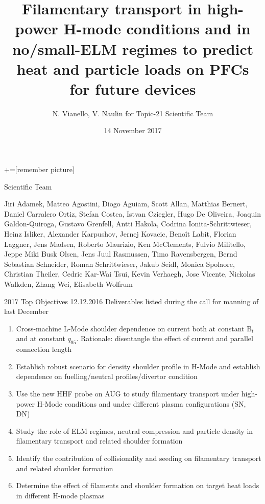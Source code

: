 \documentclass[10pt, compress]{beamer}
\title{{\small Filamentary transport in high-power H-mode conditions and in
  no/small-ELM regimes to predict heat and particle loads on PFCs for
  future devices}}
\date{{\footnotesize 14 November 2017}}
\author[N. Vianello and V. Naulin]{N. Vianello, V. Naulin for Topic-21
Scientific Team}
\newcommand\Fontvi{\fontsize{8}{7.2}\selectfont}
\begin{document}
+=[remember picture]
\maketitle
\begin{frame}{Scientific Team}
\begin{center}
  Jiri Adamek, Matteo Agostini, Diogo Aguiam, Scott Allan, Matthias Bernert, Daniel Carralero Ortiz, 
Stefan Costea, Istvan Cziegler, Hugo De Oliveira, Joaquin Galdon-Quiroga, Gustavo Grenfell, Antti Hakola, 
Codrina Ionita-Schrittwieser, Heinz Isliker, Alexander Karpushov, Jernej Kovacic, Benoît Labit, Florian Laggner, Jens Madsen, 
Roberto Maurizio, Ken McClements, Fulvio Militello, Jeppe Miki Busk Olsen, Jens Juul Rasmussen, Timo Ravensbergen, Bernd Sebastian Schneider, Roman Schrittwieser, Jakub Seidl, Monica Spolaore, Christian Theiler, Cedric Kar-Wai Tsui, Kevin Verhaegh, Jose Vicente, 
Nickolas Walkden, Zhang Wei, Elisabeth Wolfrum
\end{center}
\end{frame}

\begin{frame}{2017 Top Objectives 
    12.12.2016}
  \Fontvi
\vspace{-1cm}
Deliverables listed during the call for manning of last December 
\begin{enumerate}
\item {} Cross-machine L-Mode
  shoulder dependence on current both at constant B$_t$ and at
  constant $q_{95}$. Rationale: disentangle the effect of current and
  parallel connection length
\item {}Establish robust scenario for density
  shoulder profile in H-Mode and establish dependence on
  fuelling/neutral profiles/divertor condition
\item {}Use the new HHF probe on AUG to study
  filamentary transport under high-power H-Mode conditions and under
  different plasma configurations (SN, DN)
\item {}Study the role of ELM regimes,  neutral
  compression and particle density in filamentary transport and
  related shoulder formation
\item {} Identify the contribution of
  collisionality and seeding on filamentary transport and related
  shoulder formation
\item {}Determine the effect of filaments and
  shoulder formation on target heat loads in different H-mode plasmas
\end{enumerate}
\end{frame}
\end{document}
